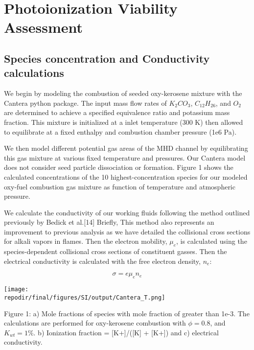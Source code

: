 
\section{Photoionization Viability Assessment}


\hypertarget{species-concentration-and-conductivity-calculations}{%
\subsection{Species concentration and Conductivity calculations}\label{species-concentration-and-conductivity-calculations}}

We begin by modeling the combustion of seeded oxy-kerosene mixture with the Cantera python package. The input mass flow rates of $K_2CO_3$, $C_{12}H_{26}$, and $O_2$ are determined to achieve a specified equivalence ratio and potassium mass fraction. This mixture is initialized at a inlet temperature (300 K) then allowed to equilibrate at a fixed enthalpy and combustion chamber pressure (1e6 Pa).

We then model different potential gas areas of the MHD channel by equilibrating this gas mixture at various fixed temperature and pressures. Our Cantera model does not consider seed particle dissociation or formation. Figure 1 shows the calculated concentrations of the 10 highest-concentration species for our modeled oxy-fuel combustion gas mixture as function of temperature and atmospheric pressure.

We calculate the conductivity of our working fluids following the method outlined previously by Bedick et al.{[}14{]} Briefly, This method also represents an improvement to previous analysis as we have detailed the collisional cross sections for alkali vapors in flames. Then the electron mobility, \(\mu_{e}\), is calculated using the species-dependent collisional cross sections of constituent gasses. Then the electrical conductivity is calculated with the free electron density, \(n_{e}\):

\begin{equation}
\sigma = e\mu_{e}n_{e}
\end{equation}


\texttt{[image: \\repodir/final/figures/SI/output/Cantera\_T.png]}

Figure 1: a) Mole fractions of species with mole fraction of greater than 1e-3. The calculations are performed for oxy-kerosene combustion with \(\phi = 0.8\), and \(K_{wt} = 1\%\). b) Ionization fraction = {[}K+{]}/({[}K{]} + {[}K+{]}) and c) electrical conductivity.

